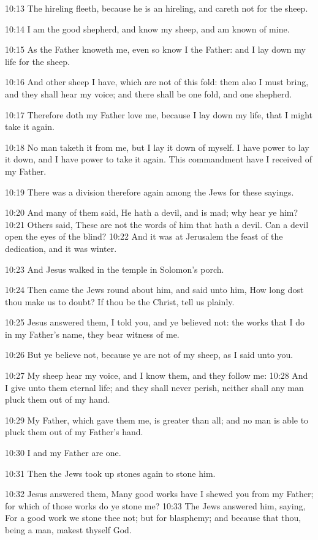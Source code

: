 10:13 The hireling fleeth, because he is an hireling, and careth not
for the sheep.

10:14 I am the good shepherd, and know my sheep, and am known of mine.

10:15 As the Father knoweth me, even so know I the Father: and I lay
down my life for the sheep.

10:16 And other sheep I have, which are not of this fold: them also I
must bring, and they shall hear my voice; and there shall be one fold,
and one shepherd.

10:17 Therefore doth my Father love me, because I lay down my life,
that I might take it again.

10:18 No man taketh it from me, but I lay it down of myself. I have
power to lay it down, and I have power to take it again. This
commandment have I received of my Father.

10:19 There was a division therefore again among the Jews for these
sayings.

10:20 And many of them said, He hath a devil, and is mad; why hear ye
him?  10:21 Others said, These are not the words of him that hath a
devil. Can a devil open the eyes of the blind?  10:22 And it was at
Jerusalem the feast of the dedication, and it was winter.

10:23 And Jesus walked in the temple in Solomon's porch.

10:24 Then came the Jews round about him, and said unto him, How long
dost thou make us to doubt? If thou be the Christ, tell us plainly.

10:25 Jesus answered them, I told you, and ye believed not: the works
that I do in my Father's name, they bear witness of me.

10:26 But ye believe not, because ye are not of my sheep, as I said
unto you.

10:27 My sheep hear my voice, and I know them, and they follow me:
10:28 And I give unto them eternal life; and they shall never perish,
neither shall any man pluck them out of my hand.

10:29 My Father, which gave them me, is greater than all; and no man
is able to pluck them out of my Father's hand.

10:30 I and my Father are one.

10:31 Then the Jews took up stones again to stone him.

10:32 Jesus answered them, Many good works have I shewed you from my
Father; for which of those works do ye stone me?  10:33 The Jews
answered him, saying, For a good work we stone thee not; but for
blasphemy; and because that thou, being a man, makest thyself God.

